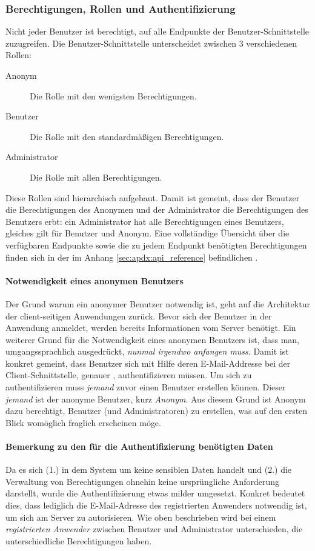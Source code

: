 \subsubsection{Berechtigungen, Rollen und Authentifizierung}\label{sec:privilegesAndAuthorization}
Nicht jeder Benutzer ist berechtigt, auf alle Endpunkte der Benutzer-Schnittstelle zuzugreifen. Die Benutzer-Schnittstelle unterscheidet zwischen 3 verschiedenen Rollen:
\begin{description}
\item[Anonym] Die Rolle mit den wenigsten Berechtigungen.  
\item[Benutzer] Die Rolle mit den standardmäßigen Berechtigungen.
\item[Administrator] Die Rolle mit allen Berechtigungen.
\end{description}
Diese Rollen sind hierarchisch aufgebaut. Damit ist gemeint, dass der Benutzer die Berechtigungen des Anonymen und der Administrator die Berechtigungen des Benutzers erbt: ein Administrator hat alle Berechtigungen eines Benutzers, gleiches gilt für Benutzer und Anonym. Eine vollständige Übersicht über die verfügbaren Endpunkte sowie die zu jedem Endpunkt benötigten Berechtigungen finden sich in der im Anhang \ref{sec:apdx:api_reference} befindlichen .
\paragraph{Notwendigkeit eines anonymen Benutzers}
Der Grund warum ein anonymer Benutzer notwendig ist, geht auf die Architektur der client-seitigen Anwendungen zurück. Bevor sich der Benutzer in der Anwendung anmeldet, werden bereits Informationen vom Server benötigt. Ein weiterer Grund für die Notwendigkeit eines anonymen Benutzers ist, dass man, umgangssprachlich ausgedrückt, \textit{nunmal irgendwo anfangen muss}. Damit ist konkret gemeint, dass Benutzer sich mit Hilfe deren E-Mail-Addresse bei der Client-Schnittstelle, genauer , authentifizieren müssen. Um sich zu authentifizieren muss \textit{jemand} zuvor einen Benutzer erstellen können. Dieser \textit{jemand} ist der anonyme Benutzer, kurz \textit{Anonym}. Aus diesem Grund ist Anonym dazu berechtigt, Benutzer (und Administratoren) zu erstellen, was auf den ersten Blick womöglich fraglich erscheinen möge.\bigskip

\paragraph{Bemerkung zu den für die Authentifizierung benötigten Daten} Da es sich (1.) in dem System um keine sensiblen Daten handelt und (2.) die Verwaltung von Berechtigungen ohnehin keine ursprüngliche Anforderung darstellt, wurde die Authentifizierung etwas milder umgesetzt. Konkret bedeutet dies, dass lediglich die E-Mail-Adresse des registrierten Anwenders notwendig ist, um sich am Server zu autorisieren. Wie oben beschrieben wird bei einem \textit{registrierten Anwender} zwischen Benutzer und Administrator unterschieden, die unterschiedliche Berechtigungen haben.

